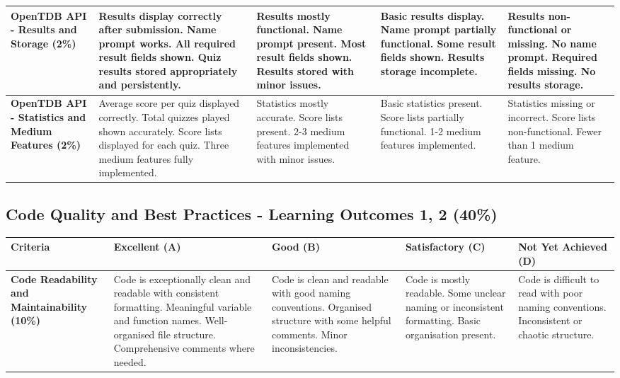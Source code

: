 \documentclass{article}
\begin{document}
\begin{landscape}
\begin{tabular}{|p{5cm}|p{4cm}|p{4cm}|p{4cm}|p{4cm}|}
\textbf{OpenTDB API - Results and Storage (2\%)} & 
Results display correctly after submission. Name prompt works. All required result fields shown. Quiz results stored appropriately and persistently. & 
Results mostly functional. Name prompt present. Most result fields shown. Results stored with minor issues. & 
Basic results display. Name prompt partially functional. Some result fields shown. Results storage incomplete. & 
Results non-functional or missing. No name prompt. Required fields missing. No results storage. \\ \hline

\textbf{OpenTDB API - Statistics and Medium Features (2\%)} & 
Average score per quiz displayed correctly. Total quizzes played shown accurately. Score lists displayed for each quiz. Three medium features fully implemented. & 
Statistics mostly accurate. Score lists present. 2-3 medium features implemented with minor issues. & 
Basic statistics present. Score lists partially functional. 1-2 medium features implemented. & 
Statistics missing or incorrect. Score lists non-functional. Fewer than 1 medium feature. \\ \hline


\end{tabular}

	\subsection*{Code Quality and Best Practices - Learning Outcomes 1, 2 (40\%)}

\begin{tabular}{|p{5cm}|p{4cm}|p{4cm}|p{4cm}|p{4cm}|}
\hline
\textbf{Criteria} & \textbf{Excellent (A)} & \textbf{Good (B)} & \textbf{Satisfactory (C)} & \textbf{Not Yet Achieved (D)} \\ \hline

\textbf{Code Readability and Maintainability (10\%)} & 
Code is exceptionally clean and readable with consistent formatting. Meaningful variable and function names. Well-organised file structure. Comprehensive comments where needed. & 
Code is clean and readable with good naming conventions. Organised structure with some helpful comments. Minor inconsistencies. & 
Code is mostly readable. Some unclear naming or inconsistent formatting. Basic organisation present. & 
Code is difficult to read with poor naming conventions. Inconsistent or chaotic structure. \\ \hline


\end{tabular}
\end{landscape}
\end{document}
